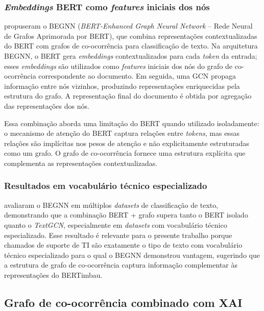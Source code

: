 \documentclass[
    12pt,                %
    openright,           %
    oneside,             %
    a4paper,             %
    english,             %
    brazil               %
]{abntex2}
\begin{document}
\subsubsection{\textit{Embeddings} BERT como \textit{features} iniciais dos nós}
\label{subsubsec:bert_grafo_embeddings}

 propuseram o BEGNN (\textit{BERT-Enhanced Graph Neural Network} -- Rede Neural de Grafos Aprimorada por BERT), que combina representações contextualizadas do BERT com grafos de co-ocorrência para classificação de texto. Na arquitetura BEGNN, o BERT gera \textit{embeddings} contextualizados para cada \textit{token} da entrada; esses \textit{embeddings} são utilizados como \textit{features} iniciais dos nós do grafo de co-ocorrência correspondente ao documento. Em seguida, uma GCN propaga informação entre nós vizinhos, produzindo representações enriquecidas pela estrutura do grafo. A representação final do documento é obtida por agregação das representações dos nós.

Essa combinação aborda uma limitação do BERT quando utilizado isoladamente: o mecanismo de atenção do BERT captura relações entre \textit{tokens}, mas essas relações são implícitas nos pesos de atenção e não explicitamente estruturadas como um grafo. O grafo de co-ocorrência fornece uma estrutura explícita que complementa as representações contextualizadas.

\subsubsection{Resultados em vocabulário técnico especializado}
\label{subsubsec:bert_grafo_resultados}

 avaliaram o BEGNN em múltiplos \textit{datasets} de classificação de texto, demonstrando que a combinação BERT + grafo supera tanto o BERT isolado quanto o \textit{TextGCN}, especialmente em \textit{datasets} com vocabulário técnico especializado. Esse resultado é relevante para o presente trabalho porque chamados de suporte de TI são exatamente o tipo de texto com vocabulário técnico especializado para o qual o BEGNN demonstrou vantagem, sugerindo que a estrutura de grafo de co-ocorrência captura informação complementar às representações do BERTimbau.

\subsection{Grafo de co-ocorrência combinado com XAI}
\label{subsec:grafo_xai}
\end{document}
